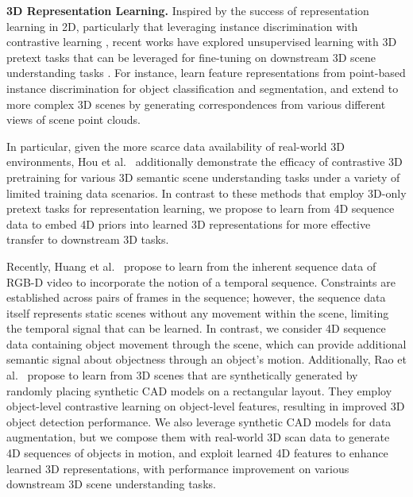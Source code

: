 \documentclass[runningheads]{llncs}
\begin{document}
\noindent \textbf{3D Representation Learning.} 
Inspired by the success of representation learning in 2D, particularly that leveraging instance discrimination with contrastive learning \cite{chen2020simple,chen2020improved,he2020momentum}, recent works have explored unsupervised learning with 3D pretext tasks that can be leveraged for fine-tuning on downstream 3D scene understanding tasks  \cite{chen2021shape,hassani2019unsupervised,hou2021exploring,huang2021spatio,liang2021exploring,rao2021randomrooms,sanghi2020info3d,sauder2019self,wang2021unsupervised,wang2021unsupervisedAAAI,xie2020pointcontrast,Zhang_2021_ICCV}. 
For instance, \cite{hassani2019unsupervised,sauder2019self} learn feature representations from point-based instance discrimination for object classification and segmentation, and \cite{hou2021exploring,xie2020pointcontrast,Zhang_2021_ICCV} extend to more complex 3D scenes by generating correspondences from various different views of scene point clouds.

In particular, given the more scarce data availability of real-world 3D environments, Hou et al.~\cite{hou2021exploring} additionally demonstrate the efficacy of contrastive 3D pretraining for various 3D semantic scene understanding tasks under a variety of limited training data scenarios.
In contrast to these methods that employ 3D-only pretext tasks for representation learning, we propose to learn from 4D sequence data to embed 4D priors into learned 3D representations for more effective transfer to downstream 3D tasks.

Recently, Huang et al.~\cite{huang2021spatio} propose to learn from the inherent sequence data of RGB-D video to incorporate the notion of a temporal sequence.
Constraints are established across pairs of frames in the sequence; however, the sequence data itself represents static scenes without any movement within the scene, limiting the temporal signal that can be learned.
In contrast, we consider 4D sequence data containing object movement through the scene, which can provide additional semantic signal about objectness through an object's motion.
Additionally, Rao et al.~\cite{rao2021randomrooms} propose to learn from 3D scenes that are synthetically generated by randomly placing synthetic CAD models on a rectangular layout.
They employ object-level contrastive learning on object-level features, resulting in improved 3D object detection performance.
We also leverage synthetic CAD models for data augmentation, but we compose them with real-world 3D scan data to generate 4D sequences of objects in motion, and exploit learned 4D features to enhance learned 3D representations, with performance improvement on various downstream 3D scene understanding tasks.
\end{document}
